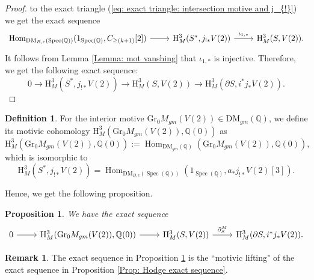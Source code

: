\documentclass[11pt, a4paper]{amsart}
\theoremstyle{plain}
\newtheorem{proposition}[theorem]{Proposition}
\theoremstyle{definition}
\newtheorem{definition}[theorem]{Definition}
\newtheorem{remark}[theorem]{Remark}
\numberwithin{equation}{section}
\def\QQ{\mathbb{Q}}
\DeclareMathOperator{\Hom}{Hom}
\DeclareMathOperator{\Spec}{Spec}
\begin{document}
\begin{proof}
to the exact triangle (\ref{eq: exact triangle: intersection motive and j_{!}}) we get the exact sequence
\begin{equation*}
    \begin{tikzcd}
       \Hom_{\mathrm{DM}_{B, c}(\Spec(\QQ))}(1_{\Spec(\QQ)}, C_{\ge(k + 1)}[2]) \ar[r] & \mathrm{H}_{M}^{3}(S^{*}, j_{!*}V(2)) \ar[r, "\iota_{1, *}"] & \mathrm{H}^{3}_{M}(S,V(2)). 
    \end{tikzcd}
\end{equation*}
It follows from Lemma \ref{Lemma: mot vanshing} that $\iota_{1, *}$ is injective. Therefore, we get the following exact sequence: 
\begin{equation*}
     0 \rightarrow  \mathrm{H}_{M}^{3}(S^{*}, j_{!*}V(2)) \rightarrow \mathrm{H}^{3}_{M}(S,V(2)) \rightarrow \mathrm{H}^{3}_{M}(\partial{S}, i^{*}j_{*}V(2)).
\end{equation*}
\end{proof}

\begin{definition}
\label{def: motivic cohomology of interior motives}
    For the interior motive $\mathrm{Gr_{0}}M_{gm}(V(2)) \in \mathrm{DM}_{gm}(\QQ)$, we define its motivic cohomology $\mathrm{H}_{M}^{3}(\mathrm{Gr_{0}}M_{gm}(V(2)), \QQ(0))$ as 
    \begin{equation*}
        \mathrm{H}_{M}^{3}(\mathrm{Gr_{0}}M_{gm}(V(2)), \QQ(0)) := \Hom_{\mathrm{DM}_{gm}(\QQ)}(\mathrm{Gr_{0}}M_{gm}(V(2)), \QQ(0)), 
    \end{equation*}
    which is isomorphic to 
    \begin{equation*}
        \mathrm{H}_{M}^{3}(S^{*}, j_{!*}V(2)) = \Hom_{\mathrm{DM}_{B, c}(\Spec(\QQ))}(1_{\Spec(\QQ)}, a_{*}j_{!*}V(2)[3]). 
    \end{equation*}
\end{definition}

Hence, we get the following proposition. 
\begin{proposition}
\label{Prop: mot exact sequence}
\label{}
    We have the exact sequence 
    \[  
        \begin{tikzcd}
            0 \ar[r] &   \mathrm{H}_{M}^{3}(\mathrm{Gr_{0}}M_{gm}(V(2)), \QQ(0)) \ar[r] & \mathrm{H}^{3}_{M}(S,V(2)) \ar[r, "{\partial_{S}^{M}}"] & \mathrm{H}^{3}_{M}(\partial{S}, i^{*}j_{*}V(2)). 
        \end{tikzcd}
    \]
\end{proposition}

\begin{remark}
    The exact sequence in Proposition \ref{Prop: mot exact sequence} is the ``motivic lifting" of the exact sequence in Proposition \ref{Prop: Hodge exact sequence}. 
\end{remark}
\end{document}
